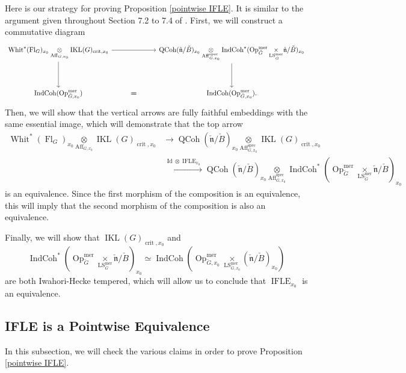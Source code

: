 \documentclass[10pt]{amsart}
\theoremstyle{remark}
\newcommand{\on}[1]{\operatorname{#1}}
\newcommand{\QCoh}{\on{QCoh}}
\newcommand{\IndCoh}{\on{IndCoh}}
\newcommand{\IKLx}{\on{IKL}(G)_{\on{crit}, x_0}}
\newcommand{\Gcheck}{\check{G}}
\newcommand{\ncheck}{\check{\mathfrak{n}}}
\newcommand{\Bcheck}{\check{B}}
\newcommand{\sssec}[1]{\subsubsection{}}
\begin{document}
\sssec{}
Here is our strategy for proving Proposition \ref{pointwise IFLE}. It is similar to the argument given throughout Section 7.2 to 7.4 of \cite{GLC2}. First, we will construct a commutative diagram
$$
\begin{tikzcd}
	{\on{Whit}^*(\on{Fl}_G)_{x_0} \underset{\on{Aff}_{G, x_0}}{\otimes} \IKLx} && {\QCoh(\ncheck/\Bcheck)_{x_0} \underset{\on{Aff}_{G, x_0}^{\on{spec}}}{\otimes} \IndCoh^*(\on{Op}_{\Gcheck}^{\on{mer}} \underset{\on{LS}_{\Gcheck}^{\on{mer}}}{\times} \ncheck/\Bcheck)_{x_0}} \\
	\\
	{\IndCoh(\on{Op}_{\Gcheck, x_0}^{\on{mer}})} & {\boldsymbol{=}} & {\IndCoh(\on{Op}_{\Gcheck, x_0}^{\on{mer}}).}
	\arrow[from=1-1, to=1-3]
	\arrow[from=1-1, to=3-1]
	\arrow[from=1-3, to=3-3]
\end{tikzcd}
$$
Then, we will show that the vertical arrows are fully faithful embeddings with the same essential image, which will demonstrate that the top arrow
\begin{align}
\on{Whit}^*(\on{Fl}_G)_{x_0} \underset{\on{Aff}_{G, x_0}}{\otimes} \on{IKL}(G)_{\on{crit}, x_0} &\longrightarrow \QCoh(\ncheck/\Bcheck)_{x_0} \underset{\on{Aff}_{G, x_0}^{\on{spec}}}{\otimes} \on{IKL}(G)_{\on{crit}, x_0} \\ &\overset{\on{Id} \otimes \on{IFLE}_{x_0}}{\longrightarrow} \QCoh(\ncheck/\Bcheck)_{x_0} \underset{\on{Aff}_{G, x_0}^{\on{spec}}}{\otimes} \IndCoh^*(\on{Op}_{\Gcheck}^{\on{mer}} \underset{\on{LS}_{\Gcheck}^{\on{mer}}}{\times} \ncheck/\Bcheck)_{x_0}
\end{align}
is an equivalence. Since the first morphism of the composition is an equivalence, this will imply that the second morphism of the composition is also an equivalence.

Finally, we will show that $\IKLx$ and 
$$
\IndCoh^*(\on{Op}_{\Gcheck}^{\on{mer}} \underset{\on{LS}_{\Gcheck}^{\on{mer}}}{\times} \ncheck/\Bcheck)_{x_0} \simeq \IndCoh(\on{Op}_{\Gcheck, x_0}^{\on{mer}} \underset{\on{LS}_{\Gcheck, x_0}^{\on{mer}}}{\times} (\ncheck/\Bcheck)_{x_0})
$$
are both Iwahori-Hecke tempered, which will allow us to conclude that $\on{IFLE}_{x_0}$ is an equivalence.

\subsection{IFLE is a Pointwise Equivalence} \label{IFLE is a Pointwise Equivalence}
In this subsection, we will check the various claims in order to prove Proposition \ref{pointwise IFLE}.
\end{document}
